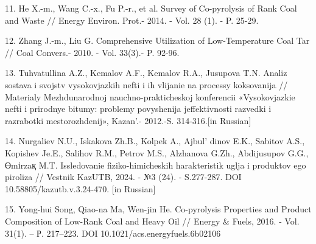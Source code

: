 \begin{references}
11. He X.-m., Wang C.-x., Fu P.-r., et al. Survey of Co-pyrolysis of
Rank Coal and Waste // Energy Environ. Prot.- 2014. - Vol. 28 (1). - P.
25-29.

12. Zhang J.-m., Liu G. Comprehensive Utilization of Low-Temperature
Coal Tar // Coal Convers.- 2010. - Vol. 33(3).- P. 92-96.

13. Tuhvatullina A.Z., Kemalov A.F., Kemalov R.A., Jusupova T.N. Analiz
sostava i svojstv vysokovjazkih nefti i ih vlijanie na processy
koksovanija // Materialy Mezhdunarodnoj nauchno-prakticheskoj
konferencii «Vysokovjazkie nefti i prirodnye bitumy: problemy
povyshenija jeffektivnosti razvedki i razrabotki mestorozhdenij»,
Kazan'.- 2012.-S. 314-316.{[}in Russian{]}

14. Nurgaliev N.U., Iskakova Zh.B., Kolpek A.,
Ajbul' dinov E.K., Sabitov A.S., Kopishev Je.E., Salihov
R.M., Petrov M.S., Alzhanova G.Zh., Abdijusupov G.G., Өmіrzaқ M.T.
Issledovanie fiziko-himicheskih harakteristik uglja i produktov ego
piroliza // Vestnik KazUTB, 2024. - №3 (24). - S.277-287. DOI
10.58805/kazutb.v.3.24-470. {[}in Russian{]}

15. Yong-hui Song, Qiao-na Ma, Wen-jin He. Co-pyrolysis Properties and
Product Composition of Low-Rank Coal and Heavy Oil // Energy \& Fuels,
2016. - Vol. 31(1). -- Р. 217--223. DOI 10.1021/acs.energyfuels.6b02106
\end{references}

